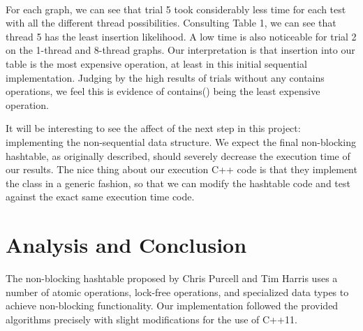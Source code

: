 \documentclass[journal]{IEEEtran}
\begin{document}
\hfill\\

For each graph, we can see that trial 5 took considerably less time for each test with all the different thread possibilities. Consulting Table 1, we can see that thread 5 has the least insertion likelihood. A low time is also noticeable for trial 2 on the 1-thread and 8-thread graphs. Our interpretation is that insertion into our table is the most expensive operation, at least in this initial sequential implementation. Judging by the high results of trials without any contains operations, we feel this is evidence of contains() being the least expensive operation.

It will be interesting to see the affect of the next step in this project: implementing the non-sequential data structure. We expect the final non-blocking hashtable, as originally described, should severely decrease the execution time of our results. The nice thing about our execution C++ code is that they implement the class in a generic fashion, so that we can modify the hashtable code and test against the exact same execution time code.



\section{Analysis and Conclusion}

The non-blocking hashtable proposed by Chris Purcell and Tim Harris uses a number of atomic operations, lock-free operations, and specialized data types to achieve non-blocking functionality.  Our implementation followed the provided algorithms precisely with slight modifications for the use of C++11. 


\ifCLASSOPTIONcaptionsoff
  \newpage
\fi



\end{document}
